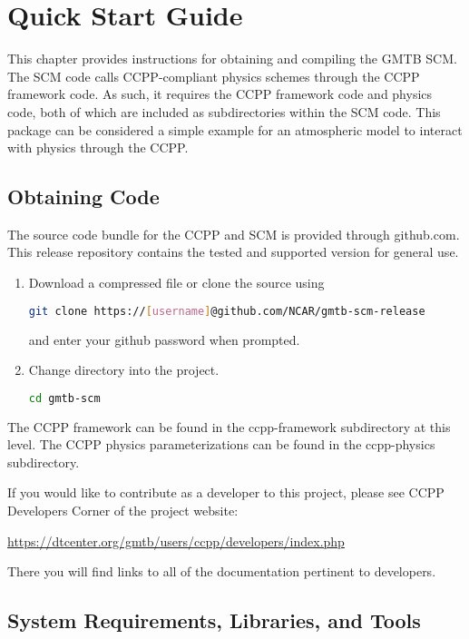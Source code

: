 \chapter{Quick Start Guide}
\label{chapter: quick}

This chapter provides instructions for obtaining and compiling  the GMTB SCM. The SCM code calls CCPP-compliant physics schemes through the CCPP framework code. As such, it requires the CCPP framework code and physics code, both of which are included as subdirectories within the SCM code. This package can be considered a simple example for an atmospheric model to interact with physics through the CCPP.

\section{Obtaining Code}

The source code bundle for the CCPP and SCM is provided through github.com.  This release repository contains the tested and supported version for general use.

\begin{enumerate}
    \item Download a compressed file or clone the source using
\begin{lstlisting}[language=bash]
git clone https://[username]@github.com/NCAR/gmtb-scm-release
\end{lstlisting}
    and enter your github password when prompted.
    \item Change directory into the project.
\begin{lstlisting}[language=bash]
cd gmtb-scm
\end{lstlisting}
\end{enumerate}

The CCPP framework can be found in the ccpp-framework subdirectory at this level.  The CCPP physics parameterizations can be found in the ccpp-physics subdirectory.

If you would like to contribute as a developer to this project, please see CCPP Developers Corner of the project website:

\url{https://dtcenter.org/gmtb/users/ccpp/developers/index.php}

There you will find links to all of the documentation pertinent to developers. 

\section{System Requirements, Libraries, and Tools}
\label{section: systemrequirements}

